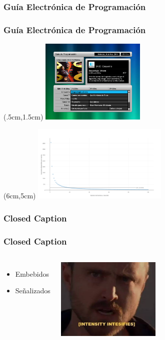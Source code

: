 \documentclass[a4paper,11pt]{beamer}
\begin{document}
		\subsubsection{Guía Electrónica de Programación}
		\begin{frame}
			\frametitle{Guía Electrónica de Programación}
			\begin{textblock*}{5cm}(.5cm,1.5cm) %
				\includegraphics[width=5cm]{epg_wari.jpg}
			\end{textblock*}
			\begin{center}
			\begin{textblock*}{5cm}(6cm,5cm) %
				\includegraphics[width=6.5cm]{eit_size.png}
			\end{textblock*}
			\end{center}
		\end{frame}

		\subsubsection{Closed Caption}
		\begin{frame}
			\frametitle{Closed Caption}
			\begin{columns}
			\column{.45\textwidth}
				\begin{itemize}
					\item Embebidos
					\item Señalizados
				\end{itemize}
			\column{.45\textwidth}
				\begin{center}
					\includegraphics[width=5cm]{closed_caption.jpg}
				\end{center}
			\end{columns}
			
		\end{frame}
\end{document}
